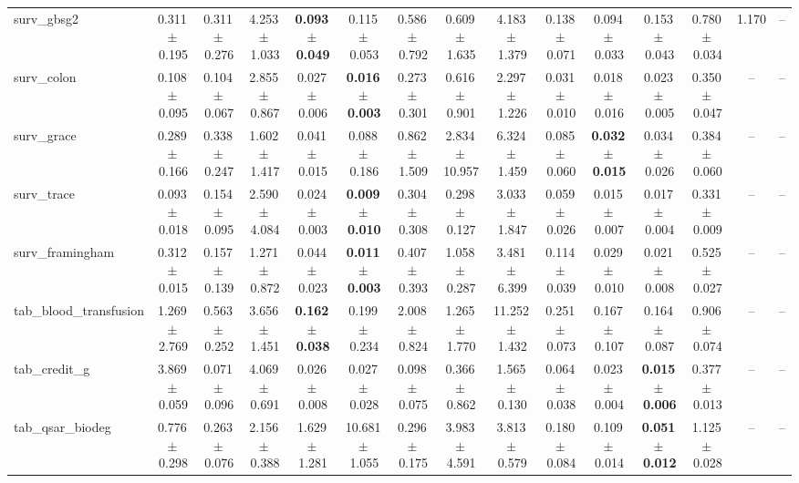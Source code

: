 \documentclass[8pt]{extarticle}
\begin{document}
\begin{longtable}{l*{14}{c}}
surv\_gbsg2 & 0.311\,$\pm$\,0.195 & 0.311\,$\pm$\,0.276 & 4.253\,$\pm$\,1.033 & \textbf{0.093\,$\pm$\,0.049} & 0.115\,$\pm$\,0.053 & 0.586\,$\pm$\,0.792 & 0.609\,$\pm$\,1.635 & 4.183\,$\pm$\,1.379 & 0.138\,$\pm$\,0.071 & 0.094\,$\pm$\,0.033 & 0.153\,$\pm$\,0.043 & 0.780\,$\pm$\,0.034 & 1.170 & -- \\
surv\_colon & 0.108\,$\pm$\,0.095 & 0.104\,$\pm$\,0.067 & 2.855\,$\pm$\,0.867 & 0.027\,$\pm$\,0.006 & \textbf{0.016\,$\pm$\,0.003} & 0.273\,$\pm$\,0.301 & 0.616\,$\pm$\,0.901 & 2.297\,$\pm$\,1.226 & 0.031\,$\pm$\,0.010 & 0.018\,$\pm$\,0.016 & 0.023\,$\pm$\,0.005 & 0.350\,$\pm$\,0.047 & -- & -- \\
surv\_grace & 0.289\,$\pm$\,0.166 & 0.338\,$\pm$\,0.247 & 1.602\,$\pm$\,1.417 & 0.041\,$\pm$\,0.015 & 0.088\,$\pm$\,0.186 & 0.862\,$\pm$\,1.509 & 2.834\,$\pm$\,10.957 & 6.324\,$\pm$\,1.459 & 0.085\,$\pm$\,0.060 & \textbf{0.032\,$\pm$\,0.015} & 0.034\,$\pm$\,0.026 & 0.384\,$\pm$\,0.060 & -- & -- \\
surv\_trace & 0.093\,$\pm$\,0.018 & 0.154\,$\pm$\,0.095 & 2.590\,$\pm$\,4.084 & 0.024\,$\pm$\,0.003 & \textbf{0.009\,$\pm$\,0.010} & 0.304\,$\pm$\,0.308 & 0.298\,$\pm$\,0.127 & 3.033\,$\pm$\,1.847 & 0.059\,$\pm$\,0.026 & 0.015\,$\pm$\,0.007 & 0.017\,$\pm$\,0.004 & 0.331\,$\pm$\,0.009 & -- & -- \\
surv\_framingham & 0.312\,$\pm$\,0.015 & 0.157\,$\pm$\,0.139 & 1.271\,$\pm$\,0.872 & 0.044\,$\pm$\,0.023 & \textbf{0.011\,$\pm$\,0.003} & 0.407\,$\pm$\,0.393 & 1.058\,$\pm$\,0.287 & 3.481\,$\pm$\,6.399 & 0.114\,$\pm$\,0.039 & 0.029\,$\pm$\,0.010 & 0.021\,$\pm$\,0.008 & 0.525\,$\pm$\,0.027 & -- & -- \\
tab\_blood\_transfusion & 1.269\,$\pm$\,2.769 & 0.563\,$\pm$\,0.252 & 3.656\,$\pm$\,1.451 & \textbf{0.162\,$\pm$\,0.038} & 0.199\,$\pm$\,0.234 & 2.008\,$\pm$\,0.824 & 1.265\,$\pm$\,1.770 & 11.252\,$\pm$\,1.432 & 0.251\,$\pm$\,0.073 & 0.167\,$\pm$\,0.107 & 0.164\,$\pm$\,0.087 & 0.906\,$\pm$\,0.074 & -- & -- \\
tab\_credit\_g & 3.869\,$\pm$\,0.059 & 0.071\,$\pm$\,0.096 & 4.069\,$\pm$\,0.691 & 0.026\,$\pm$\,0.008 & 0.027\,$\pm$\,0.028 & 0.098\,$\pm$\,0.075 & 0.366\,$\pm$\,0.862 & 1.565\,$\pm$\,0.130 & 0.064\,$\pm$\,0.038 & 0.023\,$\pm$\,0.004 & \textbf{0.015\,$\pm$\,0.006} & 0.377\,$\pm$\,0.013 & -- & -- \\
tab\_qsar\_biodeg & 0.776\,$\pm$\,0.298 & 0.263\,$\pm$\,0.076 & 2.156\,$\pm$\,0.388 & 1.629\,$\pm$\,1.281 & 10.681\,$\pm$\,1.055 & 0.296\,$\pm$\,0.175 & 3.983\,$\pm$\,4.591 & 3.813\,$\pm$\,0.579 & 0.180\,$\pm$\,0.084 & 0.109\,$\pm$\,0.014 & \textbf{0.051\,$\pm$\,0.012} & 1.125\,$\pm$\,0.028 & -- & -- \\

\end{longtable}
\end{document}

